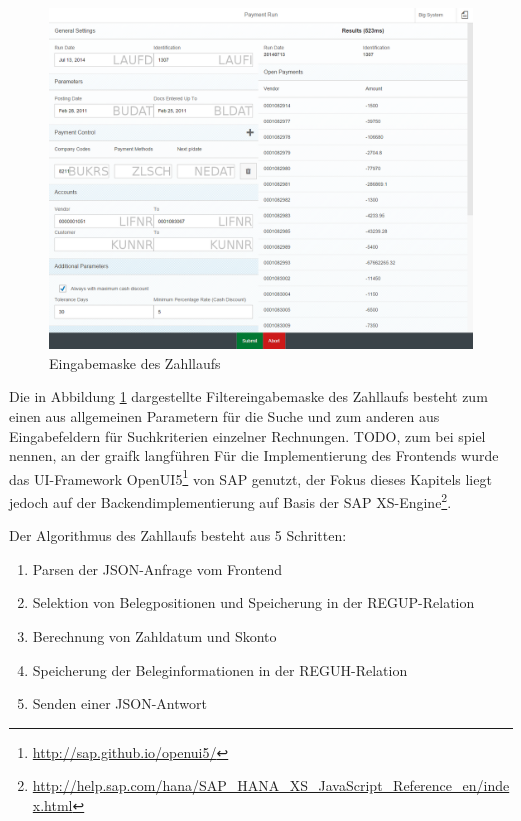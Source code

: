 \begin{figure}[ht]
	\centering
  \includegraphics[width=1\textwidth]{figures/paymentrun.png}
	\caption{Eingabemaske des Zahllaufs}
	\label{fig:paymentrun}
\end{figure}

Die in Abbildung \ref{fig:paymentrun} dargestellte Filtereingabemaske des Zahllaufs besteht zum einen aus allgemeinen Parametern für die Suche und zum anderen aus Eingabefeldern für Suchkriterien einzelner Rechnungen.
TODO, zum bei spiel nennen, an der graifk langführen
Für die Implementierung des Frontends wurde das UI-Framework OpenUI5\footnote{\url{http://sap.github.io/openui5/}} von SAP genutzt, der Fokus dieses Kapitels liegt jedoch auf der Backendimplementierung auf Basis der SAP XS-Engine\footnote{\url{http://help.sap.com/hana/SAP_HANA_XS_JavaScript_Reference_en/index.html}}.

Der Algorithmus des Zahllaufs besteht aus 5 Schritten:
   \begin{enumerate}
      \item Parsen der JSON-Anfrage vom Frontend
			\item Selektion von Belegpositionen und Speicherung in der REGUP-Relation
			\item Berechnung von Zahldatum und Skonto
			\item Speicherung der Beleginformationen in der REGUH-Relation
			\item Senden einer JSON-Antwort
   \end{enumerate}

